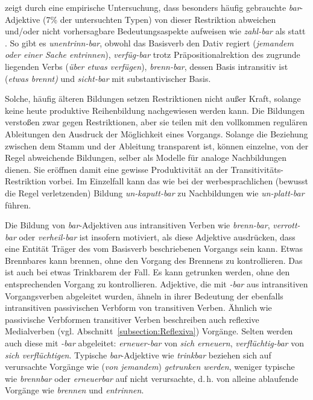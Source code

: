 \citet[54]{Riehemann1998} zeigt durch eine empirische Untersuchung, dass besonders häufig gebrauchte \textit{bar}-Adjektive (7\% der untersuchten Typen) von dieser Restriktion abweichen und/oder nicht vorhersagbare Bedeutungsaspekte aufweisen wie \textit{zahl-bar} als  statt . So gibt es \textit{unentrinn-bar}, obwohl das Basisverb den Dativ regiert (\textit{jemandem oder einer Sache entrinnen}), \textit{verfüg-bar} trotz Präpositionalrektion des zugrunde liegenden Verbs (\textit{über etwas verfügen}), \textit{brenn-bar}, dessen Basis intransitiv ist (\textit{etwas brennt)} und \textit{sicht-bar} mit substantivischer Basis. 

Solche, häufig älteren Bildungen setzen Restriktionen nicht außer Kraft, solange keine heute produktive Reihenbildung nachgewiesen werden kann. Die Bildungen verstoßen zwar gegen Restriktionen, aber sie teilen mit den vollkommen regulären Ableitungen den Ausdruck der Möglichkeit eines Vorgangs. Solange die Beziehung zwischen dem Stamm und der Ableitung transparent ist, können einzelne, von der Regel abweichende Bildungen, selber als Modelle für analoge Nachbildungen dienen. Sie eröffnen damit eine gewisse Produktivität an der Transitivitäts-Restriktion vorbei. Im Einzelfall kann das wie bei der werbesprachlichen (bewusst die Regel verletzenden) Bildung \textit{un-kaputt-bar} zu Nachbildungen wie \textit{un-platt-bar} führen. 

Die Bildung von \textit{bar}-Adjektiven aus intransitiven Verben wie \textit{brenn-bar}, \textit{verrott-bar} oder \textit{verheil-bar} ist insofern motiviert, als diese Adjektive ausdrücken, dass eine Entität Träger des vom Basisverb beschriebenen Vorgangs sein kann. Etwas Brennbares kann brennen, ohne den Vorgang des Brennens zu kontrollieren. Das ist auch bei etwas Trinkbarem der Fall. Es kann getrunken werden, ohne den entsprechenden Vorgang zu kontrollieren. Adjektive, die mit \textit{-bar} aus intransitiven Vorgangsverben abgeleitet wurden, ähneln in ihrer Bedeutung der ebenfalls intransitiven passivischen Verbform von transitiven Verben. Ähnlich wie passivische Verbformen transitiver Verben beschreiben auch reflexive Medialverben (vgl. Abschnitt~\ref{subsection:Reflexiva}) Vorgänge. Selten werden auch diese mit \textit{-bar} abgeleitet: \textit{erneuer-bar} von \textit{sich erneuern}, \textit{verflüchtig-bar} von \textit{sich verflüchtigen}. Typische \textit{bar}-Adjektive wie \textit{trinkbar} beziehen sich auf verursachte Vorgänge wie (\textit{von jemandem}) \textit{getrunken werden}, weniger typische wie \textit{brennbar} oder \textit{erneuerbar} auf nicht verursachte, d.\,h. von alleine ablaufende Vorgänge wie \textit{brennen} und \textit{entrinnen}. 

